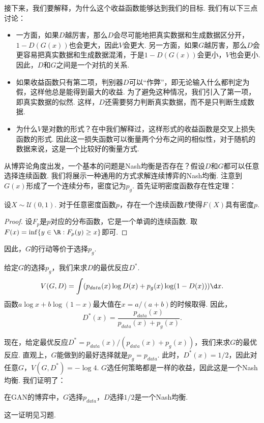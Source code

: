 接下来，我们要解释，为什么这个收益函数能够达到我们的目标. 我们有以下三点讨论：

\begin{itemize}
    \item 一方面，如果$D$越厉害，那么$D$会尽可能地把真实数据和生成数据区分开，$1-D(G(x))$也会更大，因此$V$会更大. 另一方面，如果$G$越厉害，那么$D$会更容易把真实数据和生成数据混淆，于是$1-D(G(x))$会更小，$V$也会更小. 因此，$D$和$G$之间是一个对抗的关系.
    
    \item 如果收益函数只有第二项，判别器$D$可以“作弊”，即无论输入什么都判定为假，这样他总是能得到最大的收益. 为了避免这种情况，我们引入了第一项，即真实数据的似然. 这样，$D$还需要努力判断真实数据，而不是只判断生成数据.
    
    \item 为什么$V$是对数的形式？在中我们解释过，这样形式的收益函数是交叉上损失函数的形式. 因此这一损失函数可以衡量两个分布之间的相似性，对于随机的数据来说，这是一个比较好的衡量方式.
\end{itemize}


从博弈论角度出发，一个基本的问题是Nash均衡是否存在？假设$D$和$G$都可以任意选择连续函数. 我们将展示一种通用的方式求解连续博弈的Nash均衡. 注意到$G(x)$形成了一个连续分布，密度记为$p_g$.  首先证明密度函数存在性定理：
\begin{theorem}
设$X\sim \mathcal U(0,1)$. 对于任意密度函数$p$，存在一个连续函数$F$使得$F(X)$具有密度$p$.
\end{theorem}
\begin{proof}
设$F_p$是$p$对应的分布函数，它是一个单调的连续函数. 取$F(x)=\inf\{y\in \R: F_p(y)\geq x\}$即可.
\end{proof}
因此，$G$的行动等价于选择$p_g$.

给定$G$的选择$p_g$，我们来求$D$的最优反应$D^*$.
    \[V(G,D)=\int (p_{data}(x)\log D(x)+p_g(x)\log(1-D(x)))\d x.\]
函数$a\log x+b\log(1-x)$最大值在$x=a/(a+b)$的时候取得. 因此，
    \[D^*(x)=\frac{p_{data}(x)}{p_{data}(x)+p_g(x)}.\]
    
现在，给定最优反应$D^*=p_{data}(x)/(p_{data}(x)+p_g(x))$，我们来求$G$的最优反应. 直观上，$G$能做到的最好选择就是$p_g=p_{data}$. 此时，$D^*(x)=1/2$，因此对任意$G$，$V(G,D^*)=-\log 4$. $G$选任何策略都是一样的收益，因此这是一个Nash均衡. 我们证明了：
\begin{theorem}[GAN的Nash均衡存在性]
在GAN的博弈中，$G$选择$p_{data}$，$D$选择$1/2$是一个Nash均衡.
\end{theorem}
这一证明见习题.

